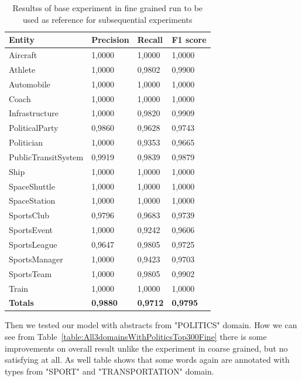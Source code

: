 \documentclass[thesis=M,english]{FITthesis}[2018/05/30]
\begin{document}
\begin{table}[H]\centering
		\begin{tabular}{|l|l|l|l|}
			\hline {\textbf{Entity}} & {\textbf{Precision}} & {\textbf{Recall}} & {\textbf{F1 score}}\\\hline
				Aircraft & 1,0000 & 1,0000 & 1,0000\\
				Athlete & 1,0000 & 0,9802 & 0,9900\\
				Automobile & 1,0000 & 1,0000 & 1,0000\\ 
				Coach & 1,0000 & 1,0000 & 1,0000\\
				Infrastructure & 1,0000 & 0,9820 & 0,9909\\
				PoliticalParty & 0,9860 & 0,9628 & 0,9743\\
				Politician & 1,0000 & 0,9353 & 0,9665\\
				PublicTransitSystem & 0,9919 & 0,9839 & 0,9879\\
				Ship & 1,0000 & 1,0000 & 1,0000\\
				SpaceShuttle & 1,0000 & 1,0000 & 1,0000\\
				SpaceStation & 1,0000 & 1,0000 & 1,0000\\ 
				SportsClub & 0,9796 & 0,9683 & 0,9739\\
				SportsEvent & 1,0000 & 0,9242 & 0,9606\\
				SportsLeague & 0,9647 & 0,9805 & 0,9725\\
				SportsManager & 1,0000 & 0,9423 & 0,9703\\
				SportsTeam & 1,0000 & 0,9805 & 0,9902\\
				Train & 1,0000 & 1,0000 & 1,0000\\\hline
				\textbf{Totals} & \textbf{0,9880} & \textbf{0,9712} & \textbf{0,9795}\\\hline
		\end{tabular}
		\caption{Resultss of base experiment in fine grained run to be used as reference for subsequential experiments \label{table:All3domainsWithAll3DomainsTop300Fine}}
	\end{table}

Then we tested our model with abstracts from "POLITICS" domain. How we can see from Table~\ref{table:All3domainsWithPoliticsTop300Fine} there is some improvements on overall result unlike the experiment in coarse grained, but no satisfying at all. As well table shows that some words again are annotated with types from "SPORT" and "TRANSPORTATION" domain.
\end{document}
